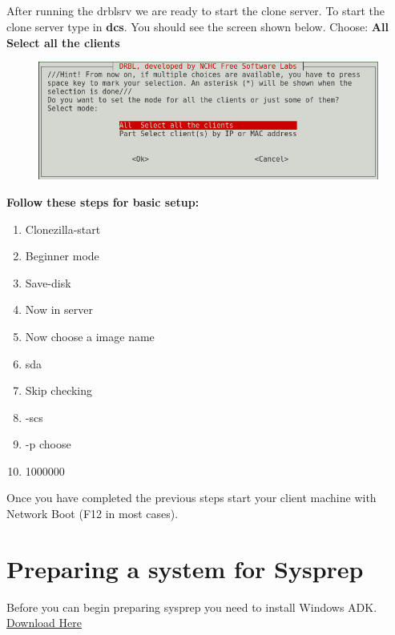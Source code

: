 \documentclass{article}
\begin{document}
\subsection{}
\label{sec:12.4}
After running the drblsrv we are ready to start the clone server. To start the clone server type in \textbf{dcs}. You should see the screen shown below.
\newline \newline
Choose: \textbf{All Select all the clients}
\begin{figure}[h]
	\centering
	\includegraphics[width=1\linewidth]{"Screenshots-clone-server/Screenshot from 2018-03-10 13-51-18"}
\end{figure}
\newline
\textbf{Follow these steps for basic setup:}
\begin{enumerate}
	\item Clonezilla-start
	\item Beginner mode
	\item Save-disk
	\item Now in server
	\item Now choose a image name
	\item sda
	\item Skip checking
	\item -scs
	\item -p choose
	\item 1000000
\end{enumerate}
Once you have completed the previous steps start your client machine with Network Boot (F12 in most cases).
\newpage
\section{Preparing a system for Sysprep}
Before you can begin preparing sysprep you need to install Windows ADK. \href{https://go.microsoft.com/fwlink/p/?linkid=859206}{Download Here}
\end{document}
